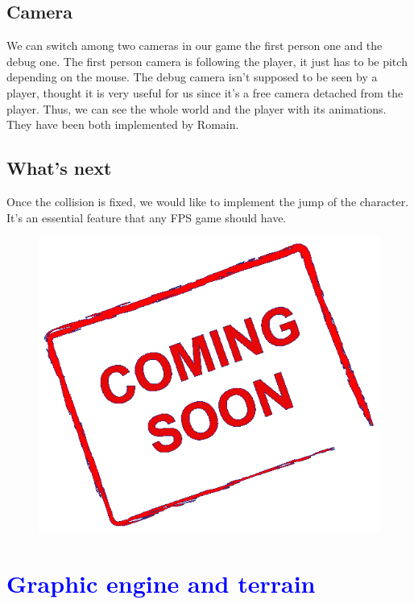 \documentclass[article]{report} %
\begin{document}
			\section{Camera}
				We can switch among two cameras in our game the first person one and the debug one. The first person camera is following the player, it just has to be pitch depending on the mouse. The debug camera isn't supposed to be seen by a player, thought it is very useful for us since it's a free camera detached from the player. Thus, we can see the whole world and the player with its animations. They have been both implemented by Romain.

			\section{What's next}
				Once the collision is fixed, we would like to implement the jump of the character. It's an essential feature that any \ac{FPS} game should have.
		\begin{figure}[h]
\includegraphics[scale=0.8]{images/Others/comingsoon.png}
\end{figure}
		\chapter{\textcolor{blue}{Graphic engine and terrain}}
\end{document}

